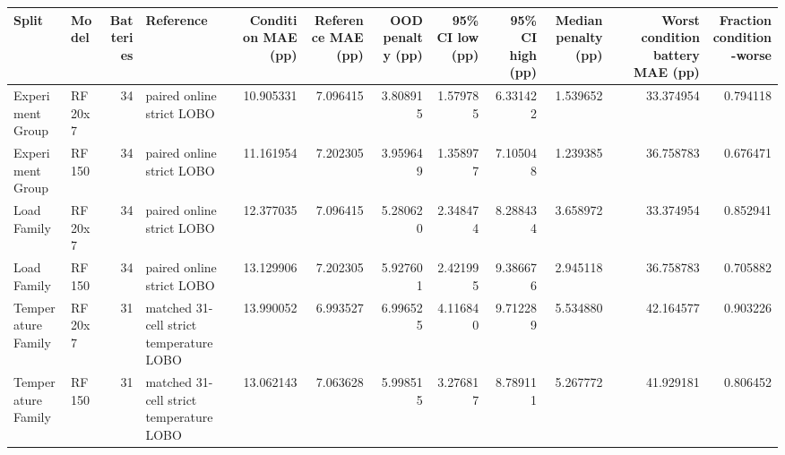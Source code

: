\begin{tabular}{llrlrrrrrrrr}
\toprule
Split & Model & Batteries & Reference & Condition MAE (pp) & Reference MAE (pp) & OOD penalty (pp) & 95\% CI low (pp) & 95\% CI high (pp) & Median penalty (pp) & Worst condition battery MAE (pp) & Fraction condition-worse \\
\midrule
Experiment Group & RF20x7 & 34 & paired online strict LOBO & 10.905331 & 7.096415 & 3.808915 & 1.579785 & 6.331422 & 1.539652 & 33.374954 & 0.794118 \\
Experiment Group & RF150 & 34 & paired online strict LOBO & 11.161954 & 7.202305 & 3.959649 & 1.358977 & 7.105048 & 1.239385 & 36.758783 & 0.676471 \\
Load Family & RF20x7 & 34 & paired online strict LOBO & 12.377035 & 7.096415 & 5.280620 & 2.348474 & 8.288434 & 3.658972 & 33.374954 & 0.852941 \\
Load Family & RF150 & 34 & paired online strict LOBO & 13.129906 & 7.202305 & 5.927601 & 2.421995 & 9.386676 & 2.945118 & 36.758783 & 0.705882 \\
Temperature Family & RF20x7 & 31 & matched 31-cell strict temperature LOBO & 13.990052 & 6.993527 & 6.996525 & 4.116840 & 9.712289 & 5.534880 & 42.164577 & 0.903226 \\
Temperature Family & RF150 & 31 & matched 31-cell strict temperature LOBO & 13.062143 & 7.063628 & 5.998515 & 3.276817 & 8.789111 & 5.267772 & 41.929181 & 0.806452 \\
\bottomrule
\end{tabular}
